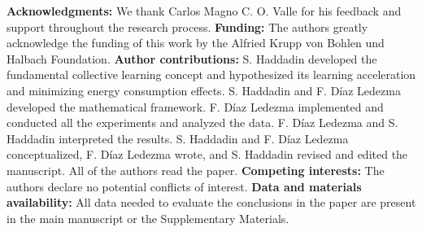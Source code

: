 \documentclass[12pt]{article}
\begin{document}
%	
%	
%	
%	
\textbf{Acknowledgments:}
We thank Carlos Magno C. O. Valle for his feedback and support throughout the research process. \textbf{Funding:} The authors greatly acknowledge the funding of this work by the Alfried Krupp von Bohlen und Halbach Foundation. \textbf{Author contributions:} S. Haddadin developed the fundamental collective learning concept and hypothesized its learning acceleration and minimizing energy consumption effects.  S. Haddadin and F. Díaz Ledezma developed the mathematical framework. F. Díaz Ledezma implemented and conducted all the experiments and analyzed the data. F. Díaz Ledezma and S. Haddadin interpreted the results. S. Haddadin and F. Díaz Ledezma conceptualized, F. Díaz Ledezma wrote, and S. Haddadin revised and edited the manuscript. All of the authors read the paper. \textbf{Competing interests:} The authors declare no potential conflicts of interest. \textbf{Data and materials availability:} All data needed to evaluate the conclusions in the paper are present in the main manuscript or the Supplementary Materials. %
\end{document}
